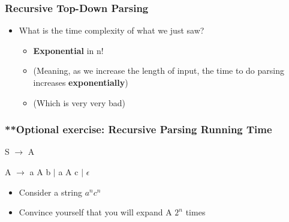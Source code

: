 \documentclass{beamer}
\begin{document}
\begin{frame}
\frametitle{Recursive Top-Down Parsing}

\begin{itemize}
\item What is the time complexity of what we just saw?
\begin{itemize}
\item {\bf Exponential} in n!
\item (Meaning, as we increase the length of input, the time to do parsing increases {\bf exponentially})
\item (Which is very very bad)
\end{itemize}
\end{itemize}
\end{frame}

\begin{frame}
\frametitle{**Optional exercise: Recursive Parsing Running Time}

S $\rightarrow$ A 

A $\rightarrow$ a A b $\vert$ a A c $\vert$ $\epsilon$

\begin{itemize}
\item Consider a string $a^nc^n$
\item Convince yourself that you will expand A $2^n$ times
\end{itemize}

\end{frame}


%
%
\end{document}
